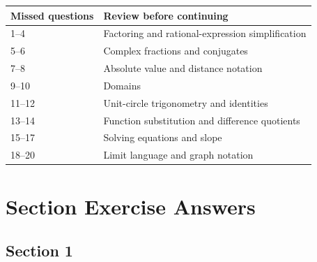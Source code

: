 \documentclass[11pt,openany]{book}
\theoremstyle{bgplain}
\begin{document}
\begin{center}
\begin{tabularx}{\textwidth}{@{}p{}X@{}}
\toprule
\textbf{Missed questions} & \textbf{Review before continuing}\\
\midrule
1--4 & Factoring and rational-expression simplification\\
5--6 & Complex fractions and conjugates\\
7--8 & Absolute value and distance notation\\
9--10 & Domains\\
11--12 & Unit-circle trigonometry and identities\\
13--14 & Function substitution and difference quotients\\
15--17 & Solving equations and slope\\
18--20 & Limit language and graph notation\\
\bottomrule
\end{tabularx}
\end{center}

\section{Section Exercise Answers}
\label{app:chapter-answers}

\subsection*{Section 1}
\end{document}
